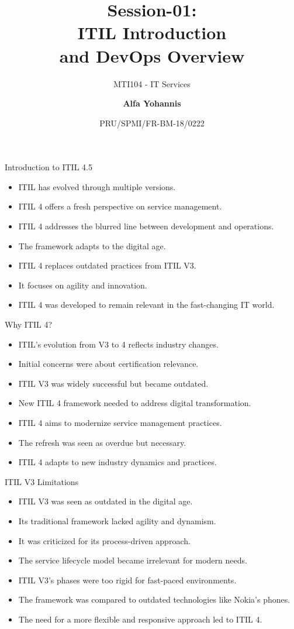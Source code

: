 \documentclass[aspectratio=169, table]{beamer}
\subtitle{MTI104 - IT Services}
\title{Session-01:\\\LARGE{ITIL Introduction\\and DevOps Overview}}
\date[Serial]{\scriptsize {PRU/SPMI/FR-BM-18/0222}}
\author[Pradita]{\small{\textbf{Alfa Yohannis}}}
\begin{document}
\frame{\titlepage}

\begin{frame}{Introduction to ITIL 4.5}
	\begin{itemize}
		\item ITIL has evolved through multiple versions.
		\item ITIL 4 offers a fresh perspective on service management.
		\item ITIL 4 addresses the blurred line between development and operations.
		\item The framework adapts to the digital age.
		\item ITIL 4 replaces outdated practices from ITIL V3.
		\item It focuses on agility and innovation.
		\item ITIL 4 was developed to remain relevant in the fast-changing IT world.
	\end{itemize}
\end{frame}

\begin{frame}{Why ITIL 4?}
	\begin{itemize}
		\item ITIL's evolution from V3 to 4 reflects industry changes.
		\item Initial concerns were about certification relevance.
		\item ITIL V3 was widely successful but became outdated.
		\item New ITIL 4 framework needed to address digital transformation.
		\item ITIL 4 aims to modernize service management practices.
		\item The refresh was seen as overdue but necessary.
		\item ITIL 4 adapts to new industry dynamics and practices.
	\end{itemize}
\end{frame}

\begin{frame}{ITIL V3 Limitations}
	\begin{itemize}
		\item ITIL V3 was seen as outdated in the digital age.
		\item Its traditional framework lacked agility and dynamism.
		\item It was criticized for its process-driven approach.
		\item The service lifecycle model became irrelevant for modern needs.
		\item ITIL V3's phases were too rigid for fast-paced environments.
		\item The framework was compared to outdated technologies like Nokia's phones.
		\item The need for a more flexible and responsive approach led to ITIL 4.
	\end{itemize}
\end{frame}
\end{document}
